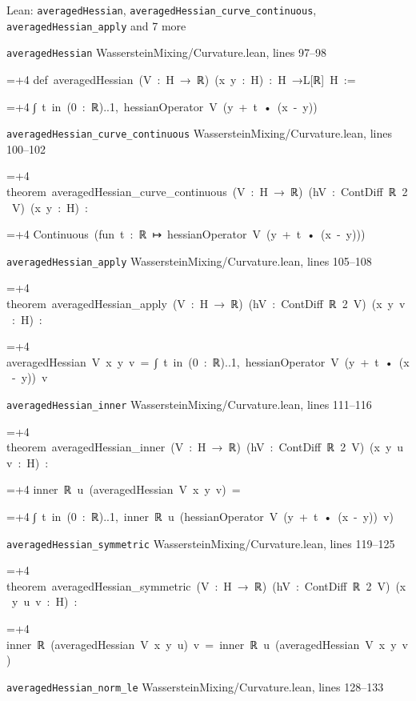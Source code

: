 \documentclass[11pt,a4paper]{article}
\newlength{\leancharwidth}
\newenvironment{leancode}{\par\smallskip\begingroup\ttfamily\footnotesize\raggedright
  \settowidth{\leancharwidth}{M}\setlength{\parskip}{0pt}\setlength{\parindent}{0pt}
  \frenchspacing}{\par\endgroup\smallskip}
\newcommand{\leanline}[2]{\hangindent=\dimexpr#1\leancharwidth+4\leancharwidth\relax
  \hangafter=1\noindent\hspace*{#1\leancharwidth}#2\par}
\newcommand{\leansource}[1]{\par{\footnotesize\color{leanmuted}#1}\par}
\begin{document}
\begin{leanbox}{Lean: \texttt{averagedHessian}, \texttt{averagedHessian\_\allowbreak{}curve\_\allowbreak{}continuous}, \texttt{averagedHessian\_\allowbreak{}apply} and 7 more}
\leansource{\texttt{averagedHessian} \quad WassersteinMixing/\allowbreak{}Curvature.lean, lines 97–98}
\begin{leancode}
\leanline{0}{def\ averagedHessian\ (V\ :\ H\ →\ ℝ)\ (x\ y\ :\ H)\ :\ H\ →L[ℝ]\ H\ :=}
\leanline{2}{∫\ t\ in\ (0\ :\ ℝ)..1,\ hessianOperator\ V\ (y\ +\ t\ •\ (x\ -\ y))}
\end{leancode}
\leansource{\texttt{averagedHessian\_\allowbreak{}curve\_\allowbreak{}continuous} \quad WassersteinMixing/\allowbreak{}Curvature.lean, lines 100–102}
\begin{leancode}
\leanline{0}{theorem\ averagedHessian\_curve\_continuous\ (V\ :\ H\ →\ ℝ)\ (hV\ :\ ContDiff\ ℝ\ 2\ V)\ (x\ y\ :\ H)\ :}
\leanline{4}{Continuous\ (fun\ t\ :\ ℝ\ ↦\ hessianOperator\ V\ (y\ +\ t\ •\ (x\ -\ y)))}
\end{leancode}
\leansource{\texttt{averagedHessian\_\allowbreak{}apply} \quad WassersteinMixing/\allowbreak{}Curvature.lean, lines 105–108}
\begin{leancode}
\leanline{0}{theorem\ averagedHessian\_apply\ (V\ :\ H\ →\ ℝ)\ (hV\ :\ ContDiff\ ℝ\ 2\ V)\ (x\ y\ v\ :\ H)\ :}
\leanline{4}{averagedHessian\ V\ x\ y\ v\ =\ ∫\ t\ in\ (0\ :\ ℝ)..1,\ hessianOperator\ V\ (y\ +\ t\ •\ (x\ -\ y))\ v}
\end{leancode}
\leansource{\texttt{averagedHessian\_\allowbreak{}inner} \quad WassersteinMixing/\allowbreak{}Curvature.lean, lines 111–116}
\begin{leancode}
\leanline{0}{theorem\ averagedHessian\_inner\ (V\ :\ H\ →\ ℝ)\ (hV\ :\ ContDiff\ ℝ\ 2\ V)\ (x\ y\ u\ v\ :\ H)\ :}
\leanline{4}{inner\ ℝ\ u\ (averagedHessian\ V\ x\ y\ v)\ =}
\leanline{6}{∫\ t\ in\ (0\ :\ ℝ)..1,\ inner\ ℝ\ u\ (hessianOperator\ V\ (y\ +\ t\ •\ (x\ -\ y))\ v)}
\end{leancode}
\leansource{\texttt{averagedHessian\_\allowbreak{}symmetric} \quad WassersteinMixing/\allowbreak{}Curvature.lean, lines 119–125}
\begin{leancode}
\leanline{0}{theorem\ averagedHessian\_symmetric\ (V\ :\ H\ →\ ℝ)\ (hV\ :\ ContDiff\ ℝ\ 2\ V)\ (x\ y\ u\ v\ :\ H)\ :}
\leanline{4}{inner\ ℝ\ (averagedHessian\ V\ x\ y\ u)\ v\ =\ inner\ ℝ\ u\ (averagedHessian\ V\ x\ y\ v)}
\end{leancode}
\leansource{\texttt{averagedHessian\_\allowbreak{}norm\_\allowbreak{}le} \quad WassersteinMixing/\allowbreak{}Curvature.lean, lines 128–133}

\end{leanbox}
\end{document}
